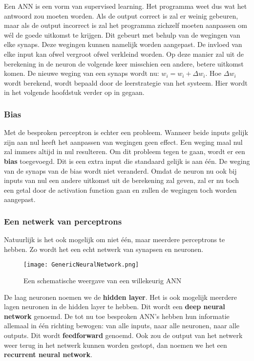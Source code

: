 Een ANN is een vorm van supervised learning. Het programma weet dus wat het antwoord zou moeten worden. Als de output correct is zal er weinig gebeuren, maar als de output incorrect is zal het programma zichzelf moeten aanpassen om w\'el de goede uitkomst te krijgen. Dit gebeurt met behulp van de wegingen van elke synaps. Deze wegingen kunnen namelijk worden aangepast. De invloed van elke input kan ofwel vergroot ofwel verkleind worden. Op deze manier zal uit de berekening in de neuron de volgende keer misschien een andere, betere uitkomst komen. De nieuwe weging van een synaps wordt nu: $ w_{i} = w_{i} + \Delta w_{i} $.
Hoe $ \Delta w_{i}$ wordt berekend, wordt bepaald door de leerstrategie van het systeem. Hier wordt in het volgende hoofdstuk verder op in gegaan.

\subsubsection{Bias}
\label{fig:Bias}
Met de besproken perceptron is echter een probleem. Wanneer beide inputs gelijk zijn aan nul heeft het aanpassen van wegingen geen effect. Een weging maal nul zal immers altijd in nul resulteren. Om dit probleem tegen te gaan, wordt er een \textbf{bias} toegevoegd. Dit is een extra input die standaard gelijk is aan \'{e}\'{e}n. De weging van de synaps van de bias wordt niet veranderd. Omdat de neuron nu ook bij inputs van nul een andere uitkomst uit de berekening zal geven, zal er nu toch een getal door de activation function gaan en zullen de wegingen toch worden aangepast. 

\subsubsection{Een netwerk van perceptrons}
Natuurlijk is het ook mogelijk om niet \'{e}\'{e}n, maar meerdere perceptrons te hebben. Zo wordt het een echt netwerk van synapsen en neuronen.

\begin{figure}[H]
  \centering
    \texttt{[image: GenericNeuralNetwork.png]}
  \caption{Een schematische weergave van een willekeurig ANN}
  \label{fig:ANN}
\end{figure}

De laag neuronen noemen we de \textbf{hidden layer}. Het is ook mogelijk meerdere lagen neuronen in de hidden layer te hebben. Dit wordt een \textbf{deep neural network} genoemd.
De tot nu toe besproken ANN's hebben hun informatie allemaal in \'{e}\'{e}n richting bewogen: van alle inputs, naar alle neuronen, naar alle outputs. Dit wordt \textbf{feedforward} genoemd. Ook zou de output van het netwerk weer terug in het netwerk kunnen worden gestopt, dan noemen we het een \textbf{recurrent neural network}.

